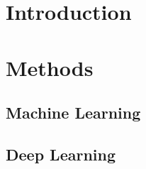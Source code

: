 \documentclass[12pt]{article}
\begin{document}
\newpage
\doublespacing
    \tableofcontents
\newpage

\section{Introduction}
\label{sec:intro}

\section{Methods}
\label{sec:methods}
    \subsection{Machine Learning}
    \subsection{Deep Learning}
\end{document}
